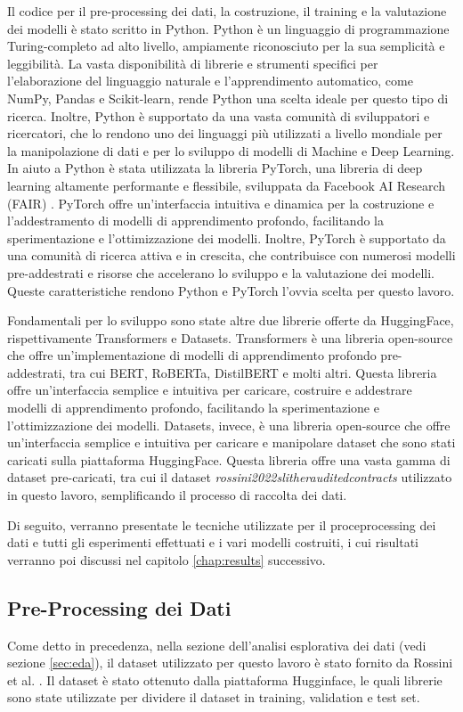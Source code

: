 \documentclass[../../Thesis.tex]{subfiles}
\begin{document}
Il codice per il pre-processing dei dati, la costruzione, il training e la valutazione dei modelli è stato scritto in Python. Python è un linguaggio di programmazione Turing-completo ad alto livello, ampiamente riconosciuto per la sua semplicità e leggibilità. La vasta disponibilità di librerie e strumenti specifici per l'elaborazione del linguaggio naturale e l'apprendimento automatico, come NumPy, Pandas e Scikit-learn, rende Python una scelta ideale per questo tipo di ricerca. Inoltre, Python è supportato da una vasta comunità di sviluppatori e ricercatori, che lo rendono uno dei linguaggi più utilizzati a livello mondiale per la manipolazione di dati e per lo sviluppo di modelli di Machine e Deep Learning. In aiuto a Python è stata utilizzata la libreria PyTorch, una libreria di deep learning altamente performante e flessibile, sviluppata da Facebook AI Research (FAIR) \cite{Pytorch}. PyTorch offre un'interfaccia intuitiva e dinamica per la costruzione e l'addestramento di modelli di apprendimento profondo, facilitando la sperimentazione e l'ottimizzazione dei modelli. Inoltre, PyTorch è supportato da una comunità di ricerca attiva e in crescita, che contribuisce con numerosi modelli pre-addestrati e risorse che accelerano lo sviluppo e la valutazione dei modelli. Queste caratteristiche rendono Python e PyTorch l'ovvia scelta per questo lavoro.

Fondamentali per lo sviluppo sono state altre due librerie offerte da HuggingFace, rispettivamente Transformers e Datasets. Transformers è una libreria open-source che offre un'implementazione di modelli di apprendimento profondo pre-addestrati, tra cui BERT, RoBERTa, DistilBERT e molti altri. Questa libreria offre un'interfaccia semplice e intuitiva per caricare, costruire e addestrare modelli di apprendimento profondo, facilitando la sperimentazione e l'ottimizzazione dei modelli. Datasets, invece, è una libreria open-source che offre un'interfaccia semplice e intuitiva per caricare e manipolare dataset che sono stati caricati sulla piattaforma HuggingFace. Questa libreria offre una vasta gamma di dataset pre-caricati, tra cui il dataset \textit{rossini2022slitherauditedcontracts} utilizzato in questo lavoro, semplificando il processo di raccolta dei dati. 

Di seguito, verranno presentate le tecniche utilizzate per il proceprocessing dei dati e tutti gli esperimenti effettuati e i vari modelli costruiti, i cui risultati verranno poi discussi nel capitolo \ref{chap:results} successivo.
\subsection{Pre-Processing dei Dati}
Come detto in precedenza, nella sezione dell'analisi esplorativa dei dati (vedi sezione \ref{sec:eda}), il dataset utilizzato per questo lavoro è stato fornito da Rossini et al. \cite{rossini2022slitherauditedcontracts}. Il dataset è stato ottenuto dalla piattaforma Hugginface, le quali librerie sono state utilizzate per dividere il dataset in training, validation e test set. 
\end{document}

